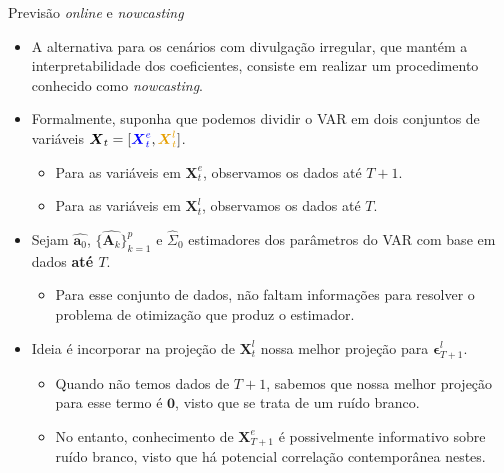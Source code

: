 \documentclass[11pt]{beamer}
\begin{document}
\begin{frame}{Previsão \textit{online} e \textit{nowcasting}}
\begin{itemize}
	\item A alternativa para os cenários com divulgação irregular, que mantém a interpretabilidade dos coeficientes, consiste em realizar um procedimento conhecido como \textit{nowcasting}.
	\item Formalmente, suponha que podemos dividir o VAR em dois conjuntos de variáveis $\boldsymbol{X}_t = [{\color{blue}\boldsymbol{X}_{t}^e}, {\color{orange}\boldsymbol{X}_{t}^l}]$.
	\begin{itemize}
		\item Para as variáveis em $\boldsymbol{X}_{t}^e$, observamos os dados {\color{blue}até $T+1$}.
				\item Para as variáveis em $\boldsymbol{X}_{t}^l$, observamos os dados {\color{orange}até $T$}.
	\end{itemize}
	\item Sejam $\hat{\boldsymbol{a}_0}$, $\{\hat{\boldsymbol{A}_k}\}_{k=1}^p$ e $\hat{\Sigma}_0$ estimadores dos parâmetros do VAR com base em dados \textbf{até $T$}.
	\begin{itemize}
		\item Para esse conjunto de dados, não faltam informações para resolver o problema de otimização que produz o estimador.
	\end{itemize}
	\item Ideia é incorporar na projeção de $\boldsymbol{X}_{t}^l$ nossa melhor projeção para $\boldsymbol{\epsilon}^l_{T+1}$.
	\begin{itemize}
		\item Quando não temos dados de $T+1$, sabemos que nossa melhor projeção para esse termo é $\boldsymbol{0}$, visto que se trata de um ruído branco.
		\item No entanto, conhecimento de  $\boldsymbol{X}_{T+1}^e$ é possivelmente informativo sobre ruído branco, visto que há potencial correlação contemporânea nestes.
	\end{itemize} 
\end{itemize}
\end{frame}
\end{document}
